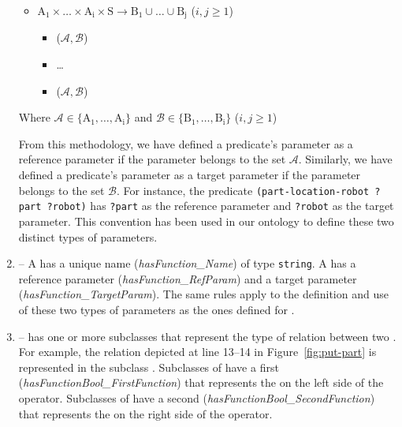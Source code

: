 \begin{enumerate}
\begin{itemize}
 \item $\mathrm{A_1\times \dots\times A_i\times S\rightarrow B_1\cup\dots\cup B_j}$ ($i, j\geq 1$)
  \begin{itemize}
  \item {}($\mathcal{A,B}$)
  \item \ldots
  \item {}($\mathcal{A,B}$)
  \end{itemize}
\end{itemize}

Where $\mathcal{A} \in \mathrm{\{A_1,\ldots,A_i\}}$ and $\mathcal{B} \in \mathrm{\{B_1,\ldots,B_i\}}$ ($i, j\geq 1$)

From this methodology, we have defined a predicate's parameter as a reference parameter if the parameter belongs to the set $\mathcal{A}$. Similarly, we have defined a predicate's parameter as a target parameter if the parameter belongs to the set $\mathcal{B}$. For instance, the predicate \texttt{(part-location-robot ?part ?robot)} has \texttt{?part} as the reference parameter and \texttt{?robot} as the target parameter. This convention has been used in our ontology to define these two distinct types of parameters.
\item {} -- A  has a unique name (\emph{hasFunction\_Name}) of type \texttt{string}. A  has a reference parameter (\emph{hasFunction\_RefParam}) and a target parameter (\emph{hasFunction\_TargetParam}). The same rules apply to the definition and use of these two types of parameters as the ones defined for .
\item {} --  has one or more subclasses that represent the type of relation between two . For example, the relation depicted at line 13--14 in Figure~\ref{fig:put-part} is represented in the subclass . Subclasses of  have a first  (\emph{hasFunctionBool\_FirstFunction}) that represents the  on the left side of the operator. Subclasses of  have a second  (\emph{hasFunctionBool\_SecondFunction}) that represents the  on the right side of the operator.
\end{enumerate}